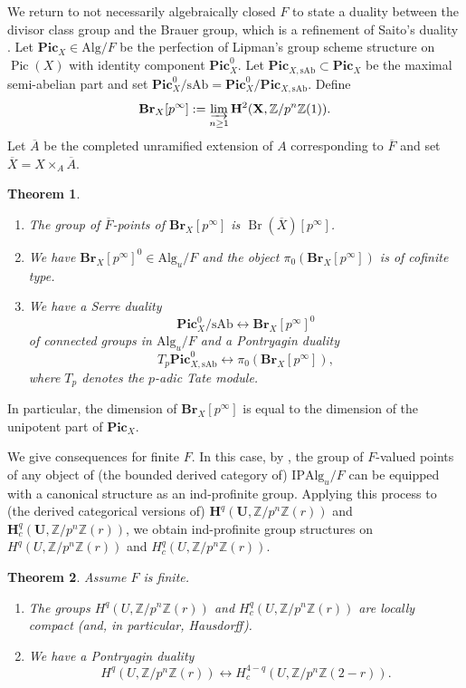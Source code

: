 \documentclass{amsart}
\newtheorem{Thm}{Theorem}[section]
\theoremstyle{remark}
\numberwithin{equation}{section}
\newcommand{\closure}[1]{\overline{#1}}
\newcommand{\Z}{\mathbb{Z}}
\newcommand{\dirlim}{\varinjlim}
\newcommand{\Alg}{\mathrm{Alg}}
\newcommand{\Ind}{\mathrm{I}}
\newcommand{\Pro}{\mathrm{P}}
\newcommand{\alg}[1]{\mathbf{#1}}
\newcommand{\sAb}{\mathrm{sAb}}
\DeclareMathOperator{\Pic}{Pic}
\DeclareMathOperator{\Br}{Br}
\begin{document}
We return to not necessarily algebraically closed $F$
to state a duality between the divisor class group and the Brauer group,
which is a refinement of Saito's duality \cite{Sai86}.
Let $\alg{Pic}_{X} \in \Alg / F$ be the perfection of Lipman's group scheme structure on $\Pic(X)$
with identity component $\alg{Pic}^{0}_{X}$.
Let $\alg{Pic}_{X, \sAb} \subset \alg{Pic}_{X}$ be the maximal semi-abelian part
and set $\alg{Pic}^{0}_{X} / \sAb = \alg{Pic}_{X}^{0} / \alg{Pic}_{X, \sAb}$.
Define
	\[
			\alg{Br}_{X}[p^{\infty}]
		:=
			\dirlim_{n \ge 1}
				\alg{H}^{2}(\alg{X}, \Z / p^{n} \Z(1)).
	\]
Let $\closure{A}$ be the completed unramified extension of $A$ corresponding to $\closure{F}$
and set $\closure{X} = X \times_{A} \closure{A}$.

\begin{Thm} \label{0083} \mbox{}
	\begin{enumerate}
		\item
			The group of $\closure{F}$-points of $\alg{Br}_{X}[p^{\infty}]$ is $\Br(\closure{X})[p^{\infty}]$.
		\item
			We have $\alg{Br}_{X}[p^{\infty}]^{0} \in \Alg_{u} / F$
			and the object $\pi_{0}(\alg{Br}_{X}[p^{\infty}])$ is of cofinite type.
		\item
			We have a Serre duality
				\[
						\alg{Pic}^{0}_{X} / \sAb
					\leftrightarrow
						\alg{Br}_{X}[p^{\infty}]^{0}
				\]
			of connected groups in $\Alg_{u} / F$ and a Pontryagin duality
				\[
						T_{p} \alg{Pic}^{0}_{X, \sAb}
					\leftrightarrow
						\pi_{0}(\alg{Br}_{X}[p^{\infty}]),
				\]
			where $T_{p}$ denotes the $p$-adic Tate module.
	\end{enumerate}
\end{Thm}

In particular, the dimension of $\alg{Br}_{X}[p^{\infty}]$ is equal to
the dimension of the unipotent part of $\alg{Pic}_{X}$.


We give consequences for finite $F$.
In this case,
by \cite[Proposition (10.3) (b)]{Suz20},
the group of $F$-valued points of any object of (the bounded derived category of) $\Ind \Pro \Alg_{u} / F$
can be equipped with a canonical structure as an ind-profinite group.
Applying this process to (the derived categorical versions of)
$\alg{H}^{q}(\alg{U}, \Z / p^{n} \Z(r))$
and $\alg{H}^{q}_{c}(\alg{U}, \Z / p^{n} \Z(r))$,
we obtain ind-profinite group structures on
$H^{q}(U, \Z / p^{n} \Z(r))$ and $H^{q}_{c}(U, \Z / p^{n} \Z(r))$.

\begin{Thm} \label{0112}
	Assume $F$ is finite.
	\begin{enumerate}
		\item
			The groups $H^{q}(U, \Z / p^{n} \Z(r))$ and $H^{q}_{c}(U, \Z / p^{n} \Z(r))$
			are locally compact (and, in particular, Hausdorff).
		\item
			We have a Pontryagin duality
				\[
						H^{q}(U, \Z / p^{n} \Z(r))
					\leftrightarrow
						H^{4 - q}_{c}(U, \Z / p^{n} \Z(2 - r)).
				\]
	\end{enumerate}
\end{Thm}
\end{document}

